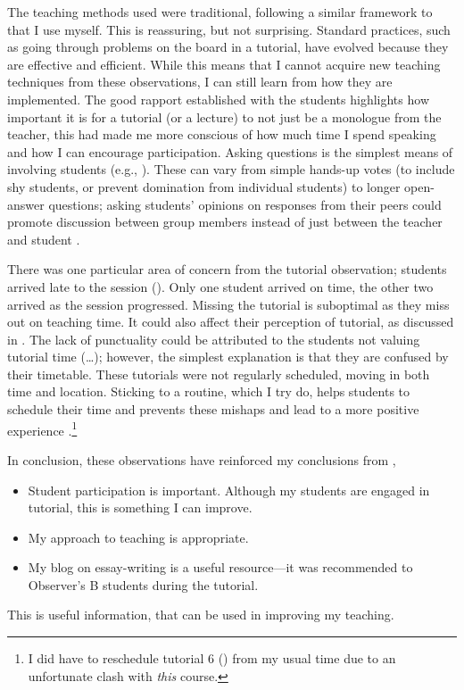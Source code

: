 The teaching methods used were traditional, following a similar framework to that I use myself. This is reassuring, but not surprising. Standard practices, such as going through problems on the board in a tutorial, have evolved because they are effective and efficient. While this means that I cannot acquire new teaching techniques from these observations, I can still learn from how they are implemented. The good rapport established with the students highlights how important it is for a tutorial (or a lecture) to not just be a monologue from the teacher, this had made me more conscious of how much time I spend speaking and how I can encourage participation. Asking questions is the simplest means of involving students (e.g., ). These can vary from simple hands-up votes (to include shy students, or prevent domination from individual students) to longer open-answer questions; asking students' opinions on responses from their peers could promote discussion between group members instead of just between the teacher and student \citep[cf.][]{Foster1981}. 

There was one particular area of concern from the tutorial observation; students arrived late to the session (). Only one student arrived on time, the other two arrived as the session progressed. Missing the tutorial is suboptimal as they miss out on teaching time. It could also affect their perception of tutorial, as discussed in . The lack of punctuality could be attributed to the students not valuing tutorial time (\ldots); however, the simplest explanation is that they are confused by their timetable. These tutorials were not regularly scheduled, moving in both time and location. Sticking to a routine, which I try do, helps students to schedule their time and prevents these mishaps and lead to a more positive experience \citep{Zaitseva2013}.\footnote{I did have to reschedule tutorial 6 () from my usual time due to an unfortunate clash with \emph{this} course.}

In conclusion, these observations have reinforced my conclusions from ,
\begin{itemize}
\item Student participation is important. Although my students are engaged in tutorial, this is something I can improve.
\item My approach to teaching is appropriate.
\item My blog on essay-writing is a useful resource---it was recommended to Observer's B students during the tutorial.
\end{itemize}
This is useful information, that can be used in improving my teaching.
